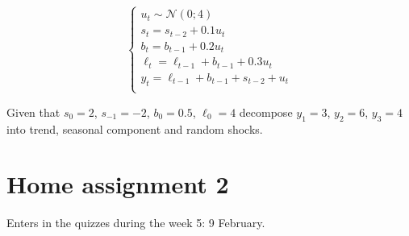 \documentclass[12pt]{article}
\newcommand{\cN}{\mathcal{N}}
\begin{document}
\begin{enumerate}
    \[
    \begin{cases}
        u_t \sim \cN(0; 4) \\
        s_t = s_{t-2} + 0.1 u_t \\
        b_t = b_{t-1} + 0.2 u_t \\
        \ell_t = \ell_{t-1} + b_{t-1} + 0.3 u_t \\
        y_t = \ell_{t-1} + b_{t-1} + s_{t-2} + u_t \\
    \end{cases}    
    \]

Given that $s_{0} = 2$, $s_{-1} = -2$, $b_{0} = 0.5$, $\ell_{0} = 4$  
decompose $y_1 = 3$, $y_2 = 6$, $y_3= 4$ into trend, seasonal component and random shocks.

\end{enumerate}

\section*{Home assignment 2}

Enters in the quizzes during the week 5: 9 February.
\end{document}
